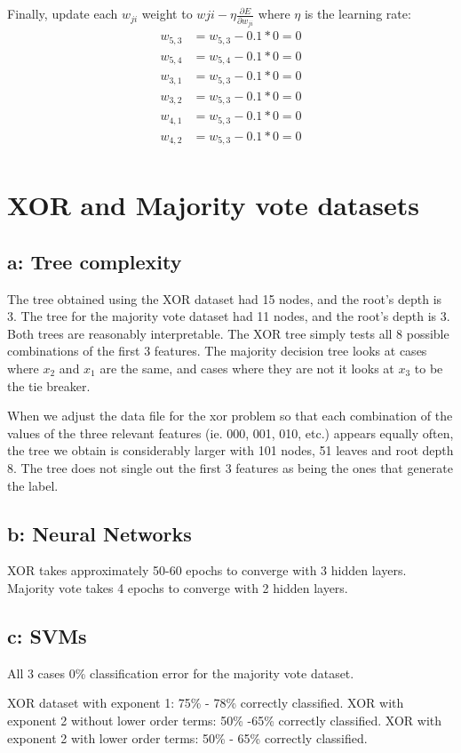 \documentclass{article}
\begin{document}
\\
\\
Finally, update each $w_{ji}$ weight to $w{ji} - \eta \frac{\partial E}{\partial w_{ji}}$ where $\eta$ is the learning rate:
\begin{align*}
 w_{5,3} &= w_{5,3} - 0.1*0 = 0\\
 w_{5,4} &= w_{5,4} - 0.1*0 = 0\\
 w_{3,1} &= w_{5,3} - 0.1*0 = 0\\
 w_{3,2} &= w_{5,3} - 0.1*0 = 0\\
 w_{4,1} &= w_{5,3} - 0.1*0 = 0\\
 w_{4,2} &= w_{5,3} - 0.1*0 = 0\\
\end{align*}

\section{XOR and Majority vote datasets}

\subsection*{a: Tree complexity}
The tree obtained using the XOR dataset had 15 nodes, and the root's depth is 3.
The tree for the majority vote dataset had 11 nodes, and the root's depth is 3.
Both trees are reasonably interpretable. The XOR tree simply tests all 8 possible combinations of the first 3 features.
The majority decision tree looks at cases where $x_2$ and $x_1$ are the same, and cases where they are not it looks at $x_3$ to be the tie breaker. 


When we adjust the data file for the xor problem so that each combination of the values of the three relevant features (ie. 000, 001, 010, etc.) appears equally often, the tree we obtain is considerably larger with 101 nodes, 51 leaves and root depth 8. The tree does not single out the first 3 features as being the ones that generate the label. 


\subsection*{b: Neural Networks}

XOR takes approximately 50-60 epochs to converge with 3 hidden layers. 
Majority vote takes 4 epochs to converge with 2 hidden layers.

\subsection*{c: SVMs}

All 3 cases 0\% classification error for the majority vote dataset. 

XOR dataset with exponent 1: 75\% - 78\% correctly classified.
XOR with exponent 2 without lower order terms: 50\% -65\% correctly classified. 
XOR with exponent 2 with lower order terms: 50\% - 65\% correctly classified. 
\end{document}
